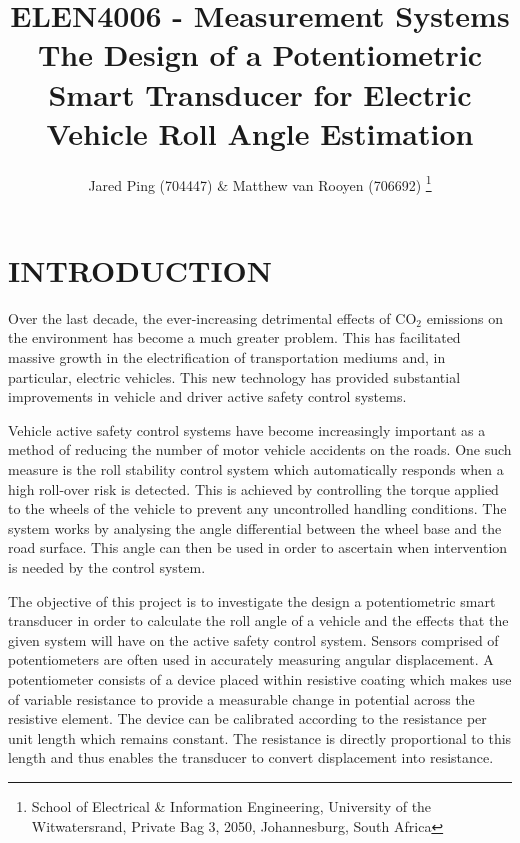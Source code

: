 \documentclass[10pt,twocolumn]{witseiepaper}
\begin{document}
	
	
\title{ELEN4006 - Measurement Systems \\ The Design of a Potentiometric Smart Transducer
	for Electric Vehicle Roll Angle Estimation}
	
\author{Jared Ping (704447) \& Matthew van Rooyen (706692)
	\thanks{School of Electrical \& Information Engineering, University of the
			Witwatersrand, Private Bag 3, 2050, Johannesburg, South Africa}
}
	
	
\abstract{}
	
	
	
\maketitle
	
	
\section{INTRODUCTION}

Over the last decade, the ever-increasing detrimental effects of $\text{CO}_2$ emissions on the environment has become a much greater problem. This has facilitated massive growth in the electrification of transportation mediums and, in particular, electric vehicles. This new technology has provided substantial improvements in vehicle and driver active safety control systems.

Vehicle active safety control systems have become increasingly important as a method of reducing the number of motor vehicle accidents on the roads. One such measure is the roll stability control system which automatically responds when a high roll-over risk is detected. This is achieved by controlling the torque applied to the wheels of the vehicle to prevent any uncontrolled handling conditions. The system works by analysing the angle differential between the wheel base and the road surface. This angle can then be used in order to ascertain when intervention is needed by the control system.

The objective of this project is to investigate the design a potentiometric smart transducer in order to calculate the roll angle of a vehicle and the effects that the given system will have on the active safety control system. Sensors comprised of potentiometers are often used in accurately measuring angular displacement\cite{Bentley}. A potentiometer consists of a device placed within resistive coating which makes use of variable resistance to provide a measurable change in potential across the resistive element. The device can be calibrated according to the resistance per unit length which remains constant. The resistance is directly proportional to this length and thus enables the transducer to convert displacement into resistance.
\end{document}
